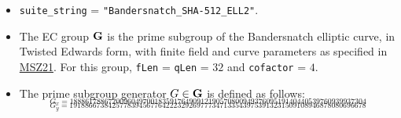 \documentclass[
]{article}
\begin{document}
\begin{itemize}
\item
  \texttt{suite\_string} = \texttt{"Bandersnatch\_SHA-512\_ELL2"}.
\item
  The EC group \(\bold{G}\) is the prime subgroup of the Bandersnatch
  elliptic curve, in Twisted Edwards form, with finite field and curve
  parameters as specified in
  \href{https://eprint.iacr.org/2021/1152}{MSZ21}. For this group,
  \texttt{fLen} = \texttt{qLen} = \(32\) and \texttt{cofactor} = \(4\).
\item
  The prime subgroup generator \(G \in \bold{G}\) is defined as follows:
  \[_{G_x = 18886178867200960497001835917649091219057080094937609519140440539760939937304}\]
  \[_{G_y = 19188667384257783945677642223292697773471335439753913231509108946878080696678}\]


\end{itemize}
\end{document}
